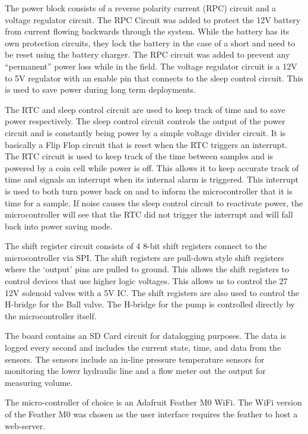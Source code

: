 \documentclass[11pt, letterpaper]{article}
\begin{document}
The power block consists of a reverse polarity current (RPC) circuit and a voltage regulator circuit. The RPC Circuit was added to protect the 12V battery from current flowing backwards through the system. While the battery has its own protection circuits, they lock the battery in the case of a short and need to be reset using the battery charger. The RPC circuit was added to prevent any “permanent” power loss while in the field. The voltage regulator circuit is a 12V to 5V regulator with an enable pin that connects to the sleep control circuit. This is used to save power during long term deployments. 
\newline\par
The RTC and sleep control circuit are used to keep track of time and to save power respectively. The sleep control circuit controls the output of the power circuit and is constantly being power by a simple voltage divider circuit. It is basically a Flip Flop circuit that is reset when the RTC triggers an interrupt. The RTC circuit is used to keep track of the time between samples and is powered by a coin cell while power is off. This allows it to keep accurate track of time and signals an interrupt when its internal alarm is triggered. This interrupt is used to both turn power back on and to inform the microcontroller that it is time for a sample. If noise causes the sleep control circuit to reactivate power, the microcontroller will see that the RTC did not trigger the interrupt and will fall back into power saving mode. 
\newline\par
The shift register circuit consists of 4 8-bit shift registers connect to the microcontroller via SPI. The shift registers are pull-down style shift registers where the ‘output’ pins are pulled to ground. This allows the shift registers to control devices that use higher logic voltages. This allows us to control the 27 12V solenoid valves with a 5V IC. The shift registers are also used to control the H-bridge for the Ball valve. The H-bridge for the pump is controlled directly by the microcontroller itself. 
\newline\par
The board contains an SD Card circuit for datalogging purposes. The data is logged every second and includes the current state, time, and data from the sensors. The sensors include an in-line pressure temperature sensors for monitoring the lower hydraulic line and a flow meter out the output for measuring volume.
\newline\par
The micro-controller of choice is an Adafruit Feather M0 WiFi. The WiFi version of the Feather M0 was chosen as the user interface requires the feather to host a web-server. 
\end{document}
